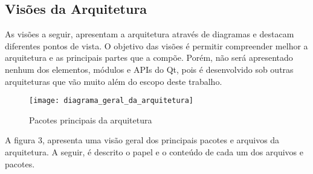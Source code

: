 \subsection{Visões da Arquitetura}
As visões a seguir, apresentam a arquitetura através de diagramas e destacam diferentes pontos de vista. O objetivo das visões é permitir compreender melhor a arquitetura e as principais partes que a compõe. Porém, não será apresentado nenhum dos elementos, módulos e APIs do Qt, pois é desenvolvido sob outras arquiteturas que vão muito além do escopo deste trabalho.\par
\begin{figure}[h]
	\texttt{[image: diagrama\_geral\_da\_arquitetura]}
	\centering
	\caption{Pacotes principais da arquitetura}
\end{figure}
A figura 3, apresenta uma visão geral dos principais pacotes e arquivos da arquitetura. A seguir, é descrito o papel e o conteúdo de cada um dos arquivos e pacotes.
